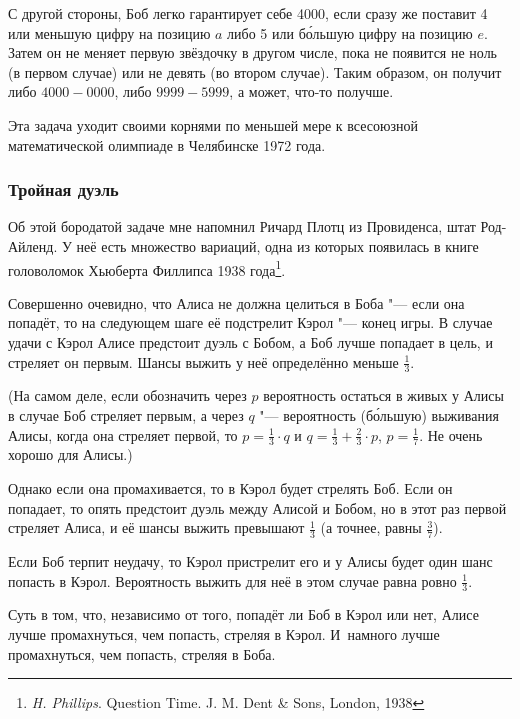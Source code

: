 \documentclass[twoside]{book}
\begin{document}
С другой стороны, Боб легко гарантирует себе 4000, если сразу же поставит 4 или меньшую цифру на позицию $a$ либо 5 или б\'{о}льшую цифру на позицию $e$.
Затем он не меняет первую звёздочку в другом числе, пока не появится не ноль (в первом случае) или не девять (во втором случае).
Таким образом, он получит либо $4000-0000$, либо $9999-5999$, а может, что-то получше.
\heart

Эта задача уходит своими корнями по меньшей мере к  всесоюзной математической олимпиаде в Челябинске 1972 года.

\subsubsection*{Тройная дуэль}%

Об этой бородатой задаче мне напомнил Ричард Плотц из Провиденса, штат Род-Айленд.
У неё есть множество вариаций, одна из которых появилась в книге головоломок Хьюберта Филлипса 1938 года\footnote{\emph{H. Phillips}. {Question Time}. J. M. Dent \& Sons, London, 1938}.


Совершенно очевидно, что Алиса не должна целиться в Боба "--- если она попадёт, то на следующем шаге её подстрелит Кэрол "--- конец игры.
В случае удачи с Кэрол Алисе предстоит дуэль с Бобом, а Боб лучше попадает в цель, и стреляет он первым.
Шансы выжить у неё определённо меньше $\tfrac13$.

(На самом деле, если обозначить через $p$ вероятность остаться в живых у Алисы в случае Боб стреляет первым, а через $q$ "--- вероятность (б\'{о}льшую) выживания Алисы, когда она стреляет первой, то $p=\tfrac13\cdot q$ и $q=\tfrac13+\tfrac23\cdot p$,  $p=\tfrac17$.
Не очень хорошо для Алисы.)

Однако если она промахивается, то в Кэрол будет стрелять Боб.
Если он попадает, то опять предстоит дуэль между Алисой и Бобом, но в этот раз первой стреляет Алиса, и её шансы выжить превышают $\tfrac13$ (а точнее, равны $\tfrac37$).

Если Боб терпит неудачу, то Кэрол пристрелит его и у Алисы будет один шанс попасть в Кэрол.
Вероятность выжить для неё в этом случае равна ровно $\tfrac13$.

Суть в том, что, независимо от того, попадёт ли Боб в Кэрол или нет, Алисе лучше промахнуться, чем попасть, стреляя в Кэрол.
И~намного лучше промахнуться, чем попасть, стреляя в Боба.
\end{document}

